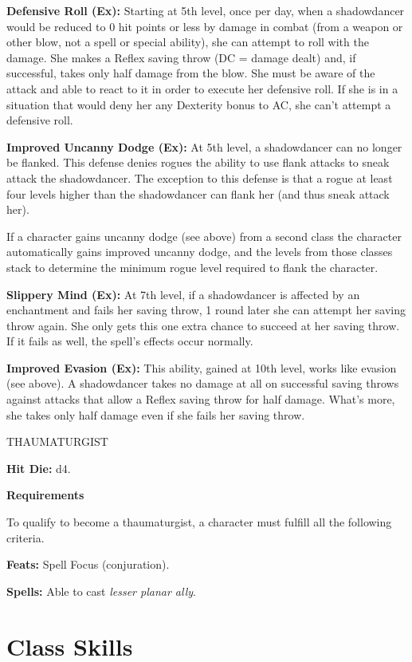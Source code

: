 \documentclass{article}
\begin{document}
\textbf{Defensive Roll (Ex):} Starting at 5th level, once per day, when a shadowdancer 
would be reduced to 0 hit points or less by damage in combat (from a weapon or 
other blow, not a spell or special ability), she can attempt to roll with the damage. 
She makes a Reflex saving throw (DC = damage dealt) and, if successful, takes only 
half damage from the blow. She must be aware of the attack and able to react to 
it in order to execute her defensive roll. If she is in a situation that would 
deny her any Dexterity bonus to AC, she can't attempt a defensive roll.

\textbf{Improved Uncanny Dodge (Ex):} At 5th level, a shadowdancer can no longer 
be flanked. This defense denies rogues the ability to use flank attacks to sneak 
attack the shadowdancer. The exception to this defense is that a rogue at least 
four levels higher than the shadowdancer can flank her (and thus sneak attack her).

If a character gains uncanny dodge (see above) from a second class the character 
automatically gains improved uncanny dodge, and the levels from those classes stack 
to determine the minimum rogue level required to flank the character.

\textbf{Slippery Mind (Ex):} At 7th level, if a shadowdancer is affected by an 
enchantment and fails her saving throw, 1 round later she can attempt her saving 
throw again. She only gets this one extra chance to succeed at her saving throw. 
If it fails as well, the spell's effects occur normally.

\textbf{Improved Evasion (Ex):} This ability, gained at 10th level, works like 
evasion (see above). A shadowdancer takes no damage at all on successful saving 
throws against attacks that allow a Reflex saving throw for half damage. What's 
more, she takes only half damage even if she fails her saving throw.

\vspace{12pt}
THAUMATURGIST

\textbf{Hit Die:} d4.

\textbf{Requirements}

To qualify to become a thaumaturgist, a character must fulfill all the following 
criteria.

\textbf{Feats:} Spell Focus (conjuration).

\textbf{Spells:} Able to cast \textit{lesser planar ally}.

\section*{\textbf{Class Skills}}
\end{document}
